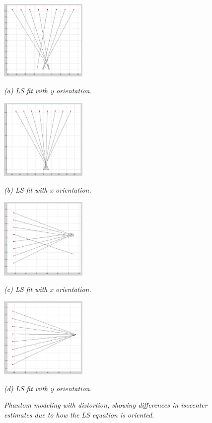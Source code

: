 \begin{figure}[htb]

  \begin{minipage}[b]{0.48\linewidth}
    \centering
    \centerline{\mbox{\includegraphics[width=1.65in]{isocenter/images/simulation/tube_plane_large_error_y.eps}}}
    \centerline{\emph{(a) LS fit with y orientation.}}\medskip
  \end{minipage}
  \hfill
  \begin{minipage}[b]{0.48\linewidth}
    \centering
    \centerline{\mbox{\includegraphics[width=1.65in]{isocenter/images/simulation/tube_plane_small_error_x.eps}}}
    \centerline{\emph{(b) LS fit with x orientation.}}\medskip
  \end{minipage}
  \begin{minipage}[b]{0.48\linewidth}
    \centering
    \centerline{\mbox{\includegraphics[width=1.65in]{isocenter/images/simulation/tube_plane_large_error_x.eps}}}
    \centerline{\emph{(c) LS fit with x orientation.}}\medskip
  \end{minipage}
  \hfill
  \begin{minipage}[b]{0.48\linewidth}
    \centering
    \centerline{\mbox{\includegraphics[width=1.65in]{isocenter/images/simulation/tube_plane_small_error_y.eps}}}
    \centerline{\emph{(d) LS fit with y orientation.}}\medskip
  \end{minipage}
\caption{\emph{Phantom modeling with distortion, showing differences in isocenter estimates due to how the LS equation is oriented.}} \label{fig:4}
%
\end{figure}

